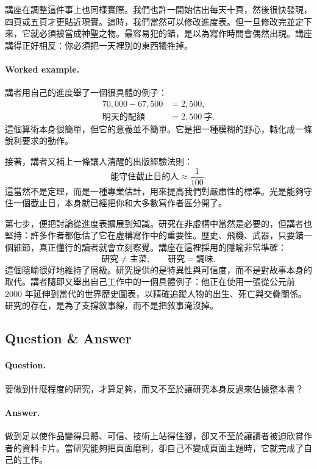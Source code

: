 講座在調整這件事上也同樣實際。我們也許一開始估出每天十頁，然後很快發現，四頁或五頁才更貼近現實。這時，我們當然可以修改進度表。但一旦修改完並定下來，它就必須被當成神聖之物。最容易犯的錯，是以為寫作時間會偶然出現。講座講得正好相反：你必須把一天裡別的東西犧牲掉。

\paragraph{Worked example.} 講者用自己的進度舉了一個很具體的例子：
\begin{align}
70{,}000 - 67{,}500 &= 2{,}500,\\
\text{明天的配額} &= 2{,}500\ \text{字}.
\end{align}
這個算術本身很簡單，但它的意義並不簡單。它是把一種模糊的野心，轉化成一條銳利要求的動作。

接著，講者又補上一條讓人清醒的出版經驗法則：
\begin{equation}
\text{能守住截止日的人} \approx \frac{1}{100}.
\end{equation}
這當然不是定理，而是一種專業估計，用來提高我們對嚴肅性的標準。光是能夠守住一個截止日，本身就已經把你和大多數寫作者區分開了。

第七步，便把討論從進度表擴展到知識。研究在非虛構中當然是必要的，但講者也堅持：許多作者都低估了它在虛構寫作中的重要性。歷史、飛機、武器，只要錯一個細節，真正懂行的讀者就會立刻察覺。講座在這裡採用的隱喻非常準確：
\begin{equation}
\text{研究} \neq \text{主菜}, \qquad
\text{研究} = \text{調味}.
\end{equation}
這個隱喻很好地維持了層級。研究提供的是特異性與可信度，而不是對故事本身的取代。講者隨即又舉出自己工作中的一個具體例子：他正在使用一張從公元前 2000 年延伸到當代的世界歷史圖表，以精確追蹤人物的出生、死亡與交疊關係。研究的存在，是為了支撐敘事線，而不是把敘事淹沒掉。

\subsection{Question \& Answer}

\paragraph{Question.} 要做到什麼程度的研究，才算足夠，而又不至於讓研究本身反過來佔據整本書？

\paragraph{Answer.} 做到足以使作品變得具體、可信、技術上站得住腳，卻又不至於讓讀者被迫欣賞作者的資料卡片。當研究能夠把頁面磨利，卻自己不變成頁面主題時，它就完成了自己的工作。

